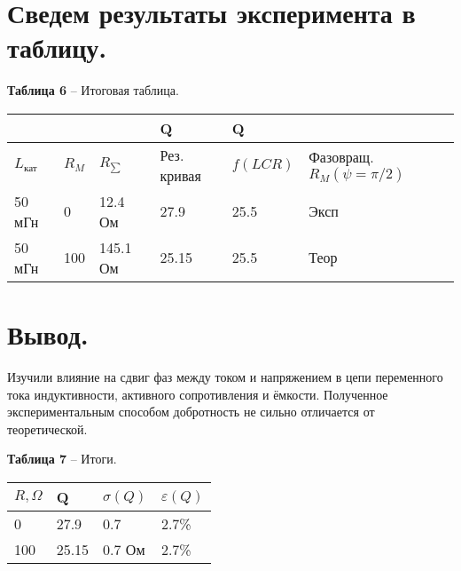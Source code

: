 \documentclass[12pt,a4paper]{article}
\begin{document}
    \section{Сведем результаты эксперимента в таблицу.}
        \begin{table}[!h]
            \begin{flushleft}%
           		\textbf{Таблица 6} --  Итоговая таблица.\\
            \end{flushleft}
                \begin{center}
                    \begin{tabular}{| l | l | l | l | l | l |}
                        \hline
                        &   &   &   Q   &   Q   &    \\
                        \hline
                        $L_\text{кат}$  &   $R_M$   &  $R_{\sum}$   &   Рез. кривая &   $f(LCR)$    &   Фазовращ. $R_M (\psi = \pi/2)$  \\
                        \hline
                        50 мГн   &   0       &   12.4 Ом    &   27.9    &   25.5    &   Эксп                             \\
                        50 мГн   &   100     &   145.1 Ом   &   25.15   &   25.5    &   Теор                             \\
                        \hline         
                    \end{tabular}
                \end{center}
            \end{table}
            
    \section{Вывод.}
        Изучили влияние на сдвиг фаз между током и напряжением в цепи переменного тока индуктивности, активного сопротивления и ёмкости. Полученное экспериментальным способом добротность не сильно отличается от теоретической.
        \begin{table}[!h]
            \begin{center}
           		\textbf{Таблица 7} --  Итоги.\\
                    \begin{tabular}{| l | l | l | l |}
                        \hline
                        $R, \Omega$ &   Q   &   $\sigma(Q)$ &   $\varepsilon(Q)$     \\
                        \hline                           
                        0   &   27.9    &   0.7   &   2.7\%    \\
                        \hline 
                        100 &   25.15   &   0.7 Ом   &   2.7\% \\
                        \hline 
                    \end{tabular}
                \end{center}
            \end{table}
\end{document}
